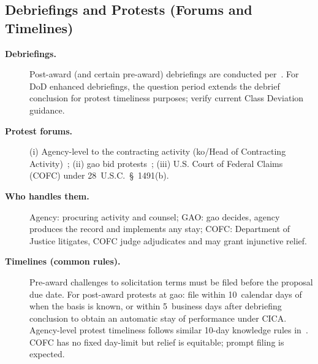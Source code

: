 \documentclass[../main.tex]{subfiles}
\begin{document}
\subsection{Debriefings and Protests (Forums and Timelines)}
\begin{description}
  \item[\textbf{Debriefings.}] Post-award (and certain pre-award) debriefings are conducted per~\autocite[\S~15.506]{FAR}. For DoD enhanced debriefings, the question period extends the debrief conclusion for protest timeliness purposes; verify current Class Deviation guidance.
  \item[\textbf{Protest forums.}] (i) Agency-level to the contracting activity (\ac{ko}/Head of Contracting Activity)~\autocite[\S~33.103]{FAR}; (ii) \ac{gao} bid protests~\autocite[\S~33.104]{FAR}; (iii) U.S. Court of Federal Claims (COFC) under 28~U.S.C.~\S~1491(b).
  \item[\textbf{Who handles them.}] Agency: procuring activity and counsel; GAO: \ac{gao} decides, agency produces the record and implements any stay; COFC: Department of Justice litigates, COFC judge adjudicates and may grant injunctive relief.
  \item[\textbf{Timelines (common rules).}] Pre-award challenges to solicitation terms must be filed before the proposal due date. For post-award protests at \ac{gao}: file within 10~calendar days of when the basis is known, or within 5~business days after debriefing conclusion to obtain an automatic stay of performance under CICA. Agency-level protest timeliness follows similar 10-day knowledge rules in~\autocite[\S~33.103]{FAR}. COFC has no fixed day-limit but relief is equitable; prompt filing is expected.
\end{description}
\end{document}
